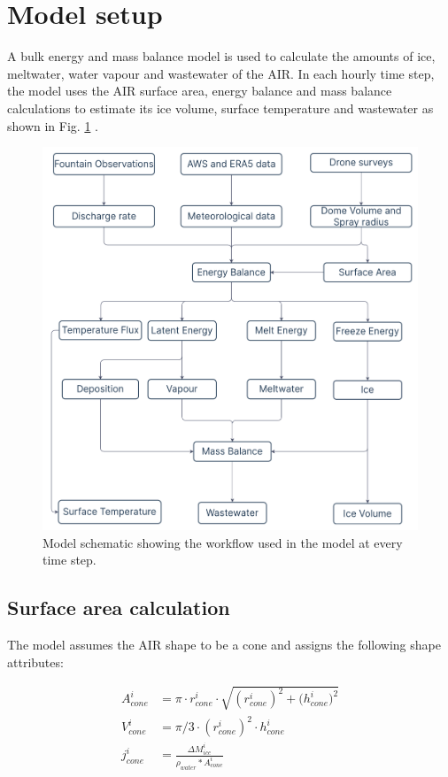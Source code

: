 \documentclass[utf8]{frontiersSCNS}
\begin{document}
\section{Model setup}

A bulk energy and mass balance model is used to calculate the amounts of ice, meltwater, water vapour and
wastewater of the AIR. In each hourly time step, the model uses the AIR surface area, energy balance and mass
balance calculations to estimate its ice volume, surface temperature and wastewater as shown in Fig.
\ref{fig:schema} .

\begin{figure}
	\begin{center}
		\includegraphics[width=10 cm]{Figures/Figure_3.jpg}
	\end{center}
	\caption{Model schematic showing the workflow used in the model at every time step. }
	\label{fig:schema}
\end{figure}

\subsection{Surface area calculation} \label{sec:shape}

The model assumes the AIR shape to be a cone and assigns the following shape attributes:

\begin{subequations}

	\begin{align}
		\label{eq:A}
		A_{cone}^i & = \pi \cdot r_{cone}^i \cdot \sqrt{{(r_{cone}^i)}^2 + {(h_{cone}^i})^ 2} \\
		\label{eq:V}
		V_{cone}^i & = \pi/3 \cdot {(r_{cone}^i)}^2 \cdot h_{cone}^i                                         \\
		\label{eq:thickness}
		j_{cone}^i & =\frac{\Delta M_{ice}^i}{\rho_{water}* A_{cone}^i}
	\end{align}
\end{subequations}
\end{document}

